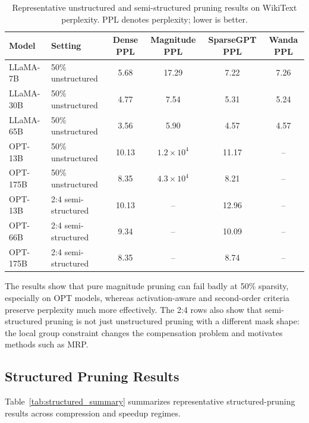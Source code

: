 \begin{table}[H]
	\centering
	\caption[Representative unstructured and semi-structured pruning results on WikiText perplexity.]{Representative unstructured and semi-structured pruning results on WikiText perplexity. PPL denotes perplexity; lower is better.}
	\label{tab:unsupported_comparison}
	\begin{tabular}{@{}llcccc@{}}
		\toprule
		\textbf{Model} & \textbf{Setting} & \textbf{Dense PPL} & \textbf{Magnitude PPL} & \textbf{SparseGPT PPL} & \textbf{Wanda PPL} \\
		\midrule
		LLaMA-7B  & 50\% unstructured & 5.68 & 17.29 & 7.22 & 7.26 \\
		LLaMA-30B & 50\% unstructured & 4.77 & 7.54  & 5.31 & 5.24 \\
		LLaMA-65B & 50\% unstructured & 3.56 & 5.90  & 4.57 & 4.57 \\
		\midrule
		OPT-13B   & 50\% unstructured & 10.13 & $1.2{\times}10^4$ & 11.17 & -- \\
		OPT-175B  & 50\% unstructured & 8.35  & $4.3{\times}10^4$ & 8.21  & -- \\
		\midrule
		OPT-13B   & 2:4 semi-structured & 10.13 & -- & 12.96 & -- \\
		OPT-66B   & 2:4 semi-structured & 9.34  & -- & 10.09 & -- \\
		OPT-175B  & 2:4 semi-structured & 8.35  & -- & 8.74  & -- \\
		\bottomrule
	\end{tabular}
\end{table}

The results show that pure magnitude pruning can fail badly at 50\% sparsity, especially on OPT models, whereas activation-aware and second-order criteria preserve perplexity much more effectively. The 2:4 rows also show that semi-structured pruning is not just unstructured pruning with a different mask shape: the local group constraint changes the compensation problem and motivates methods such as MRP.

\subsection{Structured Pruning Results}

Table~\ref{tab:structured_summary} summarizes representative structured-pruning results across compression and speedup regimes.

